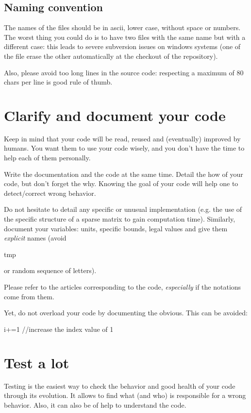 \subsection{Naming convention}
The names of the files should be in ascii, lower case, without space or numbers.
The worst thing you could do is to have two files with the same name but with a different case: 
this leads to severe subversion issues on windows systems (one of the file erase the other automatically at the checkout of the repository).

Also, please avoid too long lines in the source code: respecting a maximum of 80 chars per line is good rule of thumb.


\section{Clarify and document your code}
Keep in mind that your code will be read, reused and (eventually) improved by humans.
You want them to use your code wisely, and you don't have the time to help each of them personally.

Write the documentation and the code at the same time. 
Detail the how of your code, but don't forget the why. 
Knowing the goal of your code will help one to detect/correct wrong behavior.

Do not hesitate to detail any specific or unusual implementation
(e.g. the use of the specific structure of a sparse matrix to gain computation time).
Similarly, document your variables: units, specific bounds, legal values and give them \textit{explicit} names (avoid \begin{tt}tmp\end{tt} or random sequence of letters).	

Please refer to the articles corresponding to the code, \textit{especially} if the notations come from them.

Yet, do not overload your code by documenting the obvious. This can be avoided:\\
\begin{tt} i+=1 //increase the index value of 1\end{tt}

\section{Test a lot}
Testing is the easiest way to check the behavior and good health of your code through its evolution.
It allows to find what (and who) is responsible for a wrong behavior.
Also, it can also be of help to understand the code.

